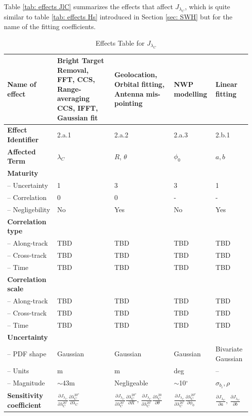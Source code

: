 Table \ref{tab: effects JlC} summarizes the effects that affect $J_{\lambda_{C}}$, which is quite similar to table \ref{tab: effects Hs} introduced in Section \ref{sec: SWH} but for the name of the fitting coefficients.
\begin{table}[h]
		\centering
		\scriptsize %
		\setlength{\tabcolsep}{2pt} %
		\caption{Effects Table for $J_{\lambda_{C}}$}
		
		\begin{tabularx}{\textwidth}{l | X | X | X | X}
			\toprule
			\textbf{Name of effect} & Bright Target Removal, FFT, CCS, Range-averaging CCS, IFFT, Gaussian fit & Geolocation, Orbital fitting, Antenna mis-pointing & NWP modelling & Linear fitting \\
			\midrule
			\textbf{Effect Identifier} & 2.a.1 & 2.a.2 & 2.a.3 & 2.b.1 \\
			\midrule
			\textbf{Affected Term} & $\lambda_C$ & $R$, $\theta$ & $\phi_{0}$ & $a, b$ \\
			\midrule
			\textbf{Maturity} &  &  &  &  \\
			\quad -- Uncertainty & 1 & 3 & 3 & 1 \\
			\quad -- Correlation & 0 & 0 & - & - \\
			\quad -- Negligebility & No & Yes & No & Yes \\
			\midrule
			\textbf{Correlation type} &  &  &  &  \\
			\quad -- Along-track & TBD & TBD & TBD & TBD \\
			\quad -- Cross-track & TBD & TBD & TBD & TBD \\
			\quad -- Time & TBD & TBD & TBD & TBD \\
			\midrule
			\textbf{Correlation scale} &  &  &  &  \\
			\quad -- Along-track & TBD & TBD & TBD & TBD \\
			\quad -- Cross-track & TBD & TBD & TBD & TBD \\
			\quad -- Time & TBD & TBD & TBD & TBD \\
			\midrule
			\textbf{Uncertainty} & & & & \\
			\quad -- PDF shape & Gaussian & Gaussian & Gaussian & Bivariate Gaussian \\
			\quad -- Units & m & m & deg & -- \\
			\quad -- Magnitude & $\sim$43m & Negligeable & $\sim$10$^\circ$ & $\sigma_{b_i}, \rho$ \\
			\midrule
			\textbf{Sensitivity coefficient} & $\frac{\partial J_{\lambda_{C}}}{\partial \lambda_C^{20^{o}}} \frac{\partial \lambda_C^{20^{o}}}{\partial \lambda_C}$ & $\frac{\partial J_{\lambda_{C}}}{\partial \lambda_C^{20^{o}}} \frac{\partial \lambda_C^{20^{o}}}{\partial R}$, $\frac{\partial J_{\lambda_{C}}}{\partial \lambda_C^{20^{o}}} \frac{\partial \lambda_C^{20}}{\partial \theta}$ & $\frac{\partial J_{\lambda_{C}}}{\partial \lambda_C^{20^{o}}} \frac{\partial \lambda_C^{20^{o}}}{\partial \phi_0}$ & $\frac{\partial J_{\lambda_{C}}}{\partial a}$, $\frac{\partial J_{\lambda_{C}}}{\partial b}$ \\

\end{tabularx}
\end{table}
